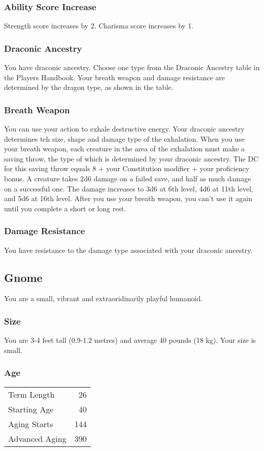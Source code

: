 \documentclass[10pt,twoside]{article}
\begin{document}
\begin{multicols}{2}
\subsubsection*{Ability Score Increase}
Strength score increases by 2.
Charisma score increases by 1.

\subsubsection*{Draconic Ancestry}
You have draconic ancestry. Choose one type from the Draconic Ancestry table in the Players Handbook. Your breath weapon and damage resistance are determined by the dragon type, as shown in the table.

\subsubsection*{Breath Weapon}
You can use your action to exhale destructive energy. Your draconic ancestry determines teh size, shape and damage type of the exhalation.
When you use your breath weapon, each creature in the area of the exhalation must make a saving throw, the type of which is determined by your draconic ancestry. The DC for this saving throw equals 8 + your Constitution modifier + your proficiency bonus. A creature takes 2d6 damage on a failed save, and half as much damage on a successful one. The damage increases to 3d6 at 6th level, 4d6 at 11th level, and 5d6 at 16th level.
After you use your breath weapon, you can't use it again until you complete a short or long rest.

\subsubsection*{Damage Resistance}
You have resistance to the damage type associated with your draconic ancestry.


\subsection{Gnome}

You are a small, vibrant and extraoridinarily playful humanoid.

\subsubsection*{Size}
You are 3-4 feet tall (0.9-1.2 metres) and average 40 pounds (18 kg). Your size is small.

\subsubsection*{Age}
\begin{tabular}{ l r }
  Term Length & 26 \\
  Starting Age & 40 \\
  Aging Starts & 144 \\
  Advanced Aging & 390 \\
\end{tabular}


\end{multicols}
\end{document}
